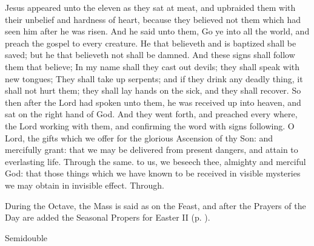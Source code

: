 
 Jesus appeared unto the eleven as they sat at meat, and upbraided them with their unbelief and hardness of heart, because they believed not them which had seen him after he was risen. And he said unto them, Go ye into all the world, and preach the gospel to every creature. He that believeth and is baptized shall be saved; but he that believeth not shall be damned. And these signs shall follow them that believe; In my name shall they cast out devils; they shall speak with new tongues; They shall take up serpents; and if they drink any deadly thing, it shall not hurt them; they shall lay hands on the sick, and they shall recover. So then after the Lord had spoken unto them, he was received up into heaven, and sat on the right hand of God. And they went forth, and preached every where, the Lord working with them, and confirming the word with signs following.
\secret
{} O Lord, the gifts which we offer for the glorious Ascension of thy Son: and mercifully grant: that we may be delivered from present dangers, and attain to everlasting life. Through the same.
\postcommunion
{} to us, we beseech thee, almighty and merciful God: that those things which we have known to be received in visible mysteries we may obtain in invisible effect. Through.
\begin{rubric}
    During the Octave, the Mass is said as on the Feast, and after the Prayers of the Day are added the Seasonal Propers for Easter II (p. \pageref{EasterII}).
\end{rubric}

\begin{inhead}
    {Semidouble}
\end{inhead}
\par\noindent
{}

